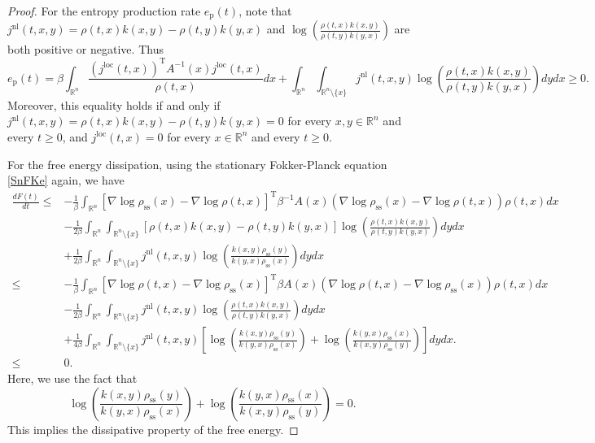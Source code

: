 \documentclass[10pt,a4paper]{amsart}
\begin{document}
\begin{proof}
For the entropy production rate $e_\mathrm{p}(t)$, note that $j^\mathrm{nl}(t,x,y)= \rho(t,x)k(x,y) - \rho(t,y)k(y,x)$ and $\log \left( \frac{\rho(t,x)k(x,y)}{\rho(t,y)k(y,x)} \right)$ are both positive or negative. Thus
\begin{equation*}
    e_\mathrm{p}(t)=\beta\int_{\mathbb{R}^n} \frac{(j^\mathrm{loc}(t,x))^\mathrm{T}A^{-1}(x)j^\mathrm{loc}(t,x) }{\rho(t,x)}dx+\int_{\mathbb{R}^n}\int_{\mathbb{R}^n \setminus \{x\}} j^\mathrm{nl}(t,x,y)\log \left( \frac{\rho(t,x)k(x,y)}{\rho(t,y)k(y,x)} \right) dydx \geq 0.
\end{equation*}
Moreover, this equality holds if and only if $j^\mathrm{nl}(t,x,y)= \rho(t,x)k(x,y) - \rho(t,y)k(y,x) = 0$ for every $x,y \in \mathbb{R}^n$ and every $t \geq 0$, and $j^\mathrm{loc}(t,x) = 0$ for every $x\in \mathbb{R}^n$ and every $t \geq 0$.

For the free energy dissipation, using the stationary Fokker-Planck equation \eqref{SnFKe} again, we have
\begin{align*}
    \frac{dF(t)}{dt}
    \leq  & - \frac{1}{\beta}\int_{\mathbb{R}^n} [\nabla \log\rho_\mathrm{ss}(x) - \nabla \log\rho(t,x) ]^\mathrm{T}\beta^{-1}A(x)(\nabla \log\rho_\mathrm{ss}(x) - \nabla \log\rho(t,x) ) \rho(t,x)dx \\
    &  - \frac{1}{2\beta} \int_{\mathbb{R}^n}\int_{\mathbb{R}^n \setminus \{x\}} [\rho(t,x)k(x,y) - \rho(t,y)k(y,x)]\log \left( \frac{\rho(t,x)k(x,y)}{\rho(t,y)k(y,x)} \right) dydx  \\
    & + \frac{1}{2\beta}\int_{\mathbb{R}^n} \int_{\mathbb{R}^n \setminus \{x\}} j^\mathrm{nl}(t,x,y)\log \left( \frac{k(x,y)\rho_\mathrm{ss}(y)}{k(y,x)\rho_\mathrm{ss}(x)}\right)dy dx\\
    \leq  & - \frac{1}{\beta}\int_{\mathbb{R}^n} [\nabla \log\rho(t,x) - \nabla \log\rho_\mathrm{ss}(x) ]^\mathrm{T}\beta A(x)(\nabla \log\rho(t,x) - \nabla \log\rho_\mathrm{ss}(x) ) \rho(t,x)dx  \\
    & - \frac{1}{2\beta} \int_{\mathbb{R}^n}\int_{\mathbb{R}^n \setminus \{x\}} j^\mathrm{nl}(t,x,y) \log \left( \frac{\rho(t,x)k(x,y)}{\rho(t,y)k(y,x)} \right) dydx  \\
    & + \frac{1}{4\beta}\int_{\mathbb{R}^n} \int_{\mathbb{R}^n \setminus \{x\}} j^\mathrm{nl}(t,x,y)\left[ \log \left( \frac{k(x,y)\rho_\mathrm{ss}(y)}{k(y,x)\rho_\mathrm{ss}(x)}\right) + \log \left( \frac{k(y,x)\rho_\mathrm{ss}(x)}{k(x,y)\rho_\mathrm{ss}(y)}\right) \right]dy dx. \\
    \leq & 0.
\end{align*}
Here, we use the fact that 
\begin{equation*}
     \log \left( \frac{k(x,y)\rho_\mathrm{ss}(y)}{k(y,x)\rho_\mathrm{ss}(x)}\right) + \log \left( \frac{k(y,x)\rho_\mathrm{ss}(x)}{k(x,y)\rho_\mathrm{ss}(y)}\right) = 0.
\end{equation*}
This implies the dissipative property of the free energy.
\end{proof}
\end{document}
